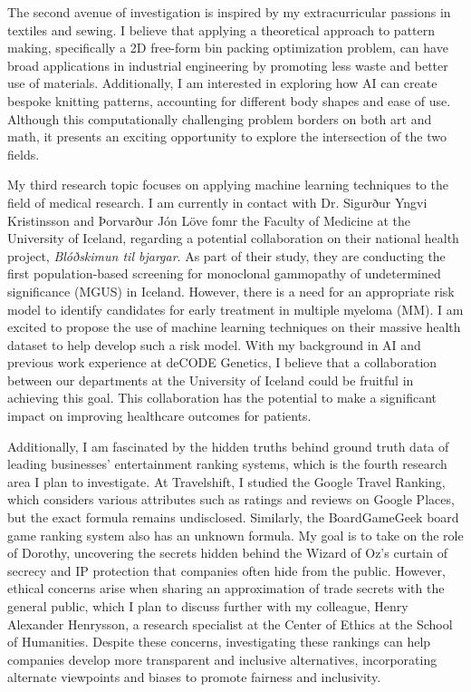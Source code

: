 \documentclass[]{cv} %
\begin{document}
The second avenue of investigation is inspired by my extracurricular passions in textiles and sewing. I believe that applying a theoretical approach to pattern making, specifically a 2D free-form bin packing optimization problem, can have broad applications in industrial engineering by promoting less waste and better use of materials. Additionally, I am interested in exploring how AI can create bespoke knitting patterns, accounting for different body shapes and ease of use. Although this computationally challenging problem borders on both art and math, it presents an exciting opportunity to explore the intersection of the two fields.

My third research topic focuses on applying machine learning techniques to the field of medical research.
I am currently in contact with Dr. Sigurður Yngvi Kristinsson and Þorvarður Jón Löve fomr the Faculty of Medicine at the University of Iceland, regarding a potential collaboration on their national health project, \textit{Blóðskimun til bjargar}. As part of their study, they are conducting the first population-based screening for monoclonal gammopathy of undetermined significance (MGUS) in Iceland. However, there is a need for an appropriate risk model to identify candidates for early treatment in multiple myeloma (MM). I am excited to propose the use of machine learning techniques on their massive health dataset to help develop such a risk model. With my background in AI and previous work experience at deCODE Genetics, I believe that a collaboration between our departments at the University of Iceland could be fruitful in achieving this goal. This collaboration has the potential to make a significant impact on improving healthcare outcomes for patients.


Additionally, I am fascinated by the hidden truths behind ground truth data of leading businesses' entertainment ranking systems, which is the fourth research area I plan to investigate. At Travelshift, I studied the Google Travel Ranking, which considers various attributes such as ratings and reviews on Google Places, but the exact formula remains undisclosed. Similarly, the BoardGameGeek board game ranking system also has an unknown formula. My goal is to take on the role of Dorothy, uncovering the secrets hidden behind the Wizard of Oz's curtain of secrecy and IP protection that companies often hide from the public. However, ethical concerns arise when sharing an approximation of trade secrets with the general public, which I plan to discuss further with my colleague, Henry Alexander Henrysson, a research specialist at the Center of Ethics at the School of Humanities. Despite these concerns, investigating these rankings can help companies develop more transparent and inclusive alternatives, incorporating alternate viewpoints and biases to promote fairness and inclusivity.
\end{document}
